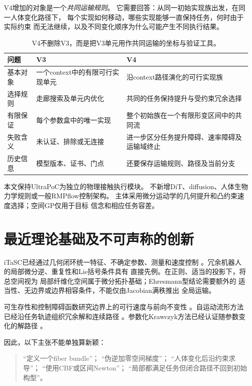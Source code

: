 \documentclass[UTF8,11pt,a4paper,fontset=fandol]{ctexart}
\numberwithin{equation}{section}
\theoremstyle{definition}
\begin{document}
V4增加的对象是一个\emph{共同运输规则}。
它需要回答：从同一初始实现族出发，在同一人体变化路径下，
每个实现如何移动，哪些实现能够一直保持任务，何时由于实际约束
而无法继续，以及不同变化顺序为什么可能产生不同执行结果。

\begin{table}[htbp]\centering\small
\begin{tabularx}{\linewidth}{p{24mm}YY}
\toprule
问题 & V3 & V4\\
\midrule
基本对象 & 一个context中的有限可行实现单元
& 沿context路径演化的可行实现族\\
选择规则 & 走廊搜索及单元内优化
& 共同的任务保持提升与受约束冗余选择\\
有限保证 & 每个参数盒中的唯一实现
& 整个初始族在一个有限形变区间中的共同流\\
失败含义 & 未认证、排除或无连接
& 进一步区分任务提升障碍、速率障碍及运输域终止\\
历史信息 & 模型版本、证书、门点
& 还要保存运输规则、路径及当前分支\\
\bottomrule
\end{tabularx}
\caption{V4不删除V3，而是把V3单元用作共同运输的坐标与验证工具。}
\end{table}

本文保持UltraPoC为独立的物理接触执行模块。
不新增DiT、diffusion、人体生物力学规则或一般RMPflow控制架构。
主体采用微分运动学的几何提升和凸约束速度选择；空间GP仅用于目标
信念和相应任务容差。

\section{最近理论基础及不可声称的创新}

iTaSC已经通过几何闭环统一特征、不确定参数、测量和速度控制
\cite{itasc}。冗余机器人的局部微分逆、重复性和Lie括号条件具有
直接先例\cite{shamir,tchon}。在正则、适当的投影下，将总空间视为
局部纤维化空间属于微分拓扑基础；Ehresmann型结论需要额外的
适当性、无边界或边界相容条件，不能仅由Jacobian满秩推出
全局运输\cite{lee,rabier}。

可生存性和控制障碍函数研究边界上的可行速度与前向不变性
\cite{ames}。自运动流形方法已经沿任务轨迹组织冗余解和连续路径
\cite{smm}。参数化Krawczyk方法已经认证随参数变化的解路径
\cite{duff}。

因此，以下主张不能单独算新颖：
\begin{quote}
``定义一个fiber bundle''；
``伪逆加零空间梯度''；
``人体变化后沿约束求导''；
``使用CBF或区间Newton''；
``局部都满足任务但闭合路径不回到初始构型''。
\end{quote}
\end{document}
